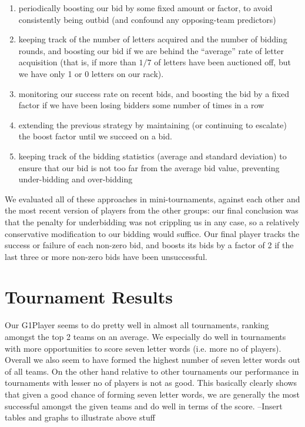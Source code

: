 \documentclass[11pt]{article}
\begin{document}
\begin{enumerate}
\item{} periodically boosting our bid by some fixed amount or factor, to avoid consistently being outbid (and confound any opposing-team predictors)
\item{} keeping track of the number of letters acquired and the number of bidding rounds, and boosting our bid if we are behind the ``average'' rate of letter acquisition (that is, if more than $1/7$ of letters have been auctioned off, but we have only 1 or 0 letters on our rack).
\item monitoring our success rate on recent bids, and boosting the bid by a fixed factor if we have been losing bidders some number of times in a row
\item extending the previous strategy by maintaining (or continuing to escalate) the boost factor until we succeed on a bid.
\item keeping track of the bidding statistics (average and standard deviation) to ensure that our bid is not too far from the average bid value, preventing under-bidding and over-bidding
\end{enumerate}

We evaluated all of these approaches in mini-tournaments, against each other and the most recent version of players from the other groups: our final conclusion was that the penalty for underbidding was not crippling us in any case, so a relatively conservative modification to our bidding would suffice.  Our final player tracks the success or failure of each non-zero bid, and boosts its bids by a factor of 2 if the last three or more non-zero bids have been unsuccessful.


\section{Tournament Results} %
	Our G1Player seems to do pretty well in almost all tournaments, ranking amongst the top 2 teams on an average. We especially do well in tournaments with more opportunities to score seven letter words (i.e. more no of players). Overall we also seem to have formed the highest number of seven letter words out of all teams. On the other hand relative to other tournaments our performance in tournaments with lesser no of players is not as good. This basically clearly shows that given a good chance of forming seven letter words, we are generally the most successful amongst the given teams and do well in terms of the score. --Insert tables and graphs to illustrate above stuff
	
\end{document}
